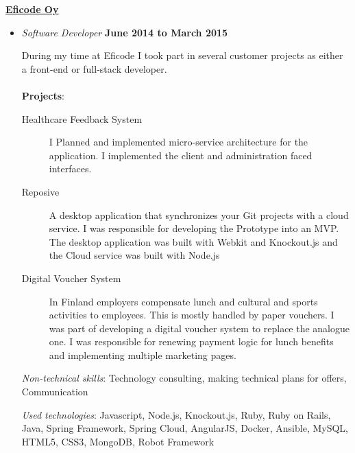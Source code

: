 \documentclass[10pt,english,a4paper]{article}
\newenvironment{outerlist}[1][\enskip\textbullet]%
        {\begin{itemize}[#1]}{\end{itemize}%
         \vspace{-.6\baselineskip}}
\newcommand{\blankline}{\quad\pagebreak[2]}
\begin{document}
\href{http://eficode.fi/}{\textbf{Eficode Oy}}
\begin{outerlist}
  \item[] \textit{Software Developer}%
  \hfill \textbf{June 2014 to March 2015}\par
    During my time at Eficode I took part in several customer projects as either a front-end or full-stack developer.
    \\
    \\
    \textbf{Projects}:
    \begin{description}
      \item [Healthcare Feedback System] I Planned and implemented micro-service architecture for the application.
      I implemented the client and administration faced interfaces.

      \item [Reposive] A desktop application that synchronizes your Git projects with a cloud service.
      I was responsible for developing the Prototype into an MVP. The desktop application was built with Webkit and Knockout.js and the Cloud service was built with Node.js

      \item [Digital Voucher System] In Finland employers compensate lunch and cultural and sports activities to employees.
      This is mostly handled by paper vouchers. I was part of developing a digital voucher system to replace the analogue one.
      I was responsible for renewing payment logic for lunch benefits and implementing multiple marketing pages.
    \end{description}

    \emph{Non-technical skills}: Technology consulting, making technical plans for offers, Communication
    \par
    \emph{Used technologies}: Javascript, Node.js, Knockout.js, Ruby, Ruby on Rails, Java, Spring Framework, Spring Cloud, AngularJS, Docker, Ansible, MySQL, HTML5, CSS3, MongoDB, Robot Framework\\
\end{outerlist}
\blankline
\end{document}
